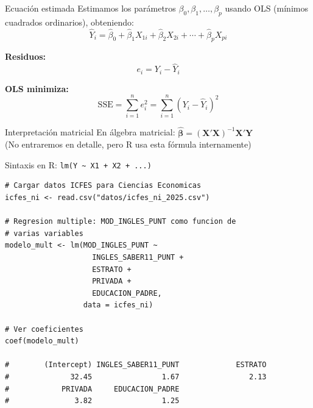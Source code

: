 \documentclass[aspectratio=169, 11pt]{beamer}
\begin{document}
\begin{frame}{Ecuación estimada}
Estimamos los parámetros $\beta_0, \beta_1, \ldots, \beta_p$ usando OLS (mínimos cuadrados ordinarios), obteniendo:
\[
\hat{Y}_i = \hat{\beta}_0 + \hat{\beta}_1 X_{1i} + \hat{\beta}_2 X_{2i} + \cdots + \hat{\beta}_p X_{pi}
\]

\vspace{0.2cm}
\textbf{Residuos:}
\[
e_i = Y_i - \hat{Y}_i
\]

\vspace{0.2cm}
\textbf{OLS minimiza:}
\[
\text{SSE} = \sum_{i=1}^{n} e_i^2 = \sum_{i=1}^{n} (Y_i - \hat{Y}_i)^2
\]

\vspace{0.2cm}
\begin{alertblock}{Interpretación matricial}
En álgebra matricial: $\boldsymbol{\hat{\beta}} = (\mathbf{X}'\mathbf{X})^{-1}\mathbf{X}'\mathbf{Y}$\\
(No entraremos en detalle, pero R usa esta fórmula internamente)
\end{alertblock}
\end{frame}

\begin{frame}[fragile]{Sintaxis en R: \texttt{lm(Y \textasciitilde{} X1 + X2 + ...)}}
\begin{lstlisting}[basicstyle=\ttfamily\scriptsize]
# Cargar datos ICFES para Ciencias Economicas
icfes_ni <- read.csv("datos/icfes_ni_2025.csv")

# Regresion multiple: MOD_INGLES_PUNT como funcion de
# varias variables
modelo_mult <- lm(MOD_INGLES_PUNT ~
                    INGLES_SABER11_PUNT +
                    ESTRATO +
                    PRIVADA +
                    EDUCACION_PADRE,
                  data = icfes_ni)

# Ver coeficientes
coef(modelo_mult)

#        (Intercept) INGLES_SABER11_PUNT             ESTRATO
#              32.45                1.67                2.13
#            PRIVADA     EDUCACION_PADRE
#               3.82                1.25
\end{lstlisting}
\end{frame}
\end{document}
